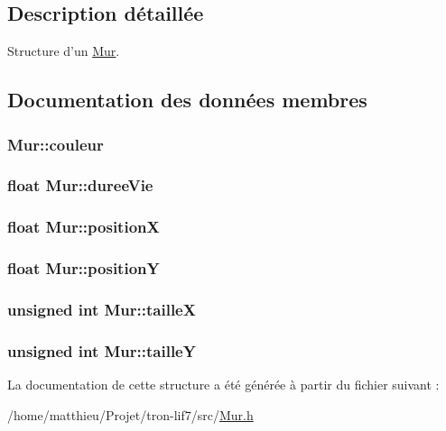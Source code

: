 \subsection{Description détaillée}
Structure d'un \hyperlink{structMur}{Mur}. 

\subsection{Documentation des données membres}
\hypertarget{structMur_adfb47de65971e21c8b3012cfcf7cab28}{
\subsubsection[{couleur}]{ Mur\-::couleur}}\label{structMur_adfb47de65971e21c8b3012cfcf7cab28}
\hypertarget{structMur_a7b0f44b48d4a8408e1adeb057ad201f8}{
\subsubsection[{duree\-Vie}]{\setlength{\rightskip}{0pt plus 5cm}float Mur\-::duree\-Vie}}\label{structMur_a7b0f44b48d4a8408e1adeb057ad201f8}
\hypertarget{structMur_affc832d25c091c05a2ab0340a38e8617}{
\subsubsection[{position\-X}]{\setlength{\rightskip}{0pt plus 5cm}float Mur\-::position\-X}}\label{structMur_affc832d25c091c05a2ab0340a38e8617}
\hypertarget{structMur_a5cb3e3d2e2f71120f6746772a44a0980}{
\subsubsection[{position\-Y}]{\setlength{\rightskip}{0pt plus 5cm}float Mur\-::position\-Y}}\label{structMur_a5cb3e3d2e2f71120f6746772a44a0980}
\hypertarget{structMur_a83d5a0639f49e58cfb805a91702d6701}{
\subsubsection[{taille\-X}]{\setlength{\rightskip}{0pt plus 5cm}unsigned int Mur\-::taille\-X}}\label{structMur_a83d5a0639f49e58cfb805a91702d6701}
\hypertarget{structMur_ad0c6b841ae4069d6b4e6559d7e88cf47}{
\subsubsection[{taille\-Y}]{\setlength{\rightskip}{0pt plus 5cm}unsigned int Mur\-::taille\-Y}}\label{structMur_ad0c6b841ae4069d6b4e6559d7e88cf47}


La documentation de cette structure a été générée à partir du fichier suivant \-:\begin{DoxyCompactItemize}
\item 
/home/matthieu/\-Projet/tron-\/lif7/src/\hyperlink{Mur_8h}{Mur.\-h}\end{DoxyCompactItemize}
